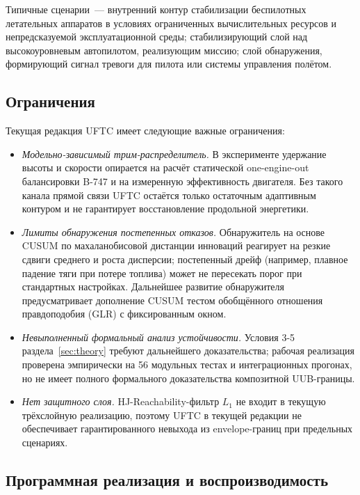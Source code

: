 \documentclass[a4paper,14pt]{extarticle}
\newcommand{\UFTC}{\textsc{UFTC}}
\newcommand{\CUSUM}{\textsc{CUSUM}}
\begin{document}
Типичные сценарии~--- внутренний контур стабилизации беспилотных летательных аппаратов в условиях ограниченных вычислительных ресурсов и непредсказуемой эксплуатационной среды; стабилизирующий слой над высокоуровневым автопилотом, реализующим миссию; слой обнаружения, формирующий сигнал тревоги для пилота или системы управления полётом.

\subsection{Ограничения}

Текущая редакция \UFTC{} имеет следующие важные ограничения:

\begin{itemize}
\item \emph{Модельно-зависимый трим-распределитель.} В эксперименте удержание высоты и скорости опирается на расчёт статической one-engine-out балансировки B-747 и на измеренную эффективность двигателя. Без такого канала прямой связи \UFTC{} остаётся только остаточным адаптивным контуром и не гарантирует восстановление продольной энергетики.
\item \emph{Лимиты обнаружения постепенных отказов.} Обнаружитель на основе \CUSUM{} по махаланобисовой дистанции инноваций реагирует на резкие сдвиги среднего и роста дисперсии; постепенный дрейф (например, плавное падение тяги при потере топлива) может не пересекать порог при стандартных настройках. Дальнейшее развитие обнаружителя предусматривает дополнение \CUSUM{} тестом обобщённого отношения правдоподобия (GLR) с фиксированным окном.
\item \emph{Невыполненный формальный анализ устойчивости.} Условия 3-5 раздела~\ref{sec:theory} требуют дальнейшего доказательства; рабочая реализация проверена эмпирически на 56 модульных тестах и интеграционных прогонах, но не имеет полного формального доказательства композитной UUB-границы.
\item \emph{Нет защитного слоя.} HJ-Reachability-фильтр $L_1$ не входит в текущую трёхслойную реализацию, поэтому \UFTC{} в текущей редакции не обеспечивает гарантированного невыхода из envelope-границ при предельных сценариях.
\end{itemize}

\subsection{Программная реализация и воспроизводимость}
\end{document}
